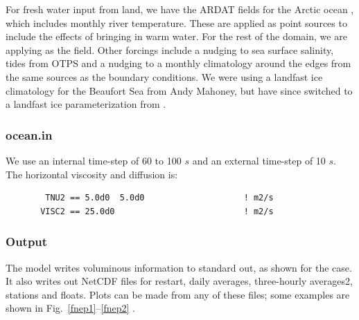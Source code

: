 For fresh water input from land, we have the ARDAT fields for the
Arctic ocean \citep{Whitefield_2015}, which includes monthly river
temperature. These are applied as point sources to include the effects
of bringing in warm water. For the rest of the domain, we are applying
\citet{Dai_2009} as the  field. Other forcings include a
nudging to sea surface salinity, tides from OTPS and a nudging to
a monthly climatology around the edges from the same sources as the
boundary conditions. We were using a landfast ice climatology for the
Beaufort Sea from Andy Mahoney, but have since switched to a landfast
ice parameterization from \citet{Lemieux_2015}.

\subsubsection{ocean.in}
We use an internal time-step of 60 to 100 $s$ and an external time-step of 10
$s$. The horizontal viscosity and diffusion is:
\begin{verbatim}
        TNU2 == 5.0d0  5.0d0                    ! m2/s
       VISC2 == 25.0d0                          ! m2/s
\end{verbatim}

\subsubsection{Output}
The model writes voluminous information to standard out, as shown
for the  case.  It also writes out NetCDF files for
restart, daily averages, three-hourly averages2, stations and floats.
Plots can be made from any of these files; some examples are shown
in Fig.\ \ref{fnep1}--\ref{fnep2} .

